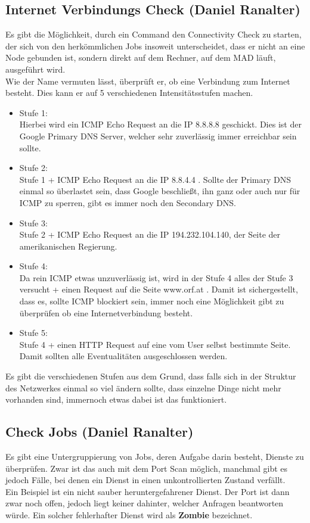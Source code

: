 \documentclass[12pt,a4paper]{report}
\begin{document}
\begin{onehalfspace}
\subsection{Internet Verbindungs Check (Daniel Ranalter)}
Es gibt die Möglichkeit, durch ein Command den Connectivity Check zu starten, der sich von den herkömmlichen Jobs insoweit unterscheidet, dass er nicht an eine Node gebunden ist, sondern direkt auf dem Rechner, auf dem MAD läuft, ausgeführt wird.\\
Wie der Name vermuten lässt, überprüft er, ob eine Verbindung zum Internet besteht. Dies kann er auf 5 verschiedenen Intensitätsstufen machen.\\
\begin{itemize}
\item Stufe 1:\\
Hierbei wird ein ICMP Echo Request an die IP 8.8.8.8 geschickt. Dies ist der Google Primary DNS Server, welcher sehr zuverlässig immer erreichbar sein sollte.
\item Stufe 2:\\
Stufe 1 + ICMP Echo Request an die IP 8.8.4.4 . Sollte der Primary DNS einmal so überlastet sein, dass Google beschließt, ihn ganz oder auch nur für ICMP zu sperren, gibt es immer noch den Secondary DNS.
\item Stufe 3:\\
Stufe 2 + ICMP Echo Request an die IP 194.232.104.140, der Seite der amerikanischen Regierung. 
\item Stufe 4:\\
Da rein ICMP etwas unzuverlässig ist, wird in der Stufe 4 alles der Stufe 3 versucht + einen Request auf die Seite www.orf.at . Damit ist sichergestellt, dass es, sollte ICMP blockiert sein, immer noch eine Möglichkeit gibt zu überprüfen ob eine Internetverbindung besteht.
\item Stufe 5:\\
Stufe 4 + einen HTTP Request auf eine vom User selbst bestimmte Seite. Damit sollten alle Eventualitäten ausgeschlossen werden. 
\end{itemize}

Es gibt die verschiedenen Stufen aus dem Grund, dass falls sich in der Struktur des Netzwerkes einmal so viel ändern sollte, dass einzelne Dinge nicht mehr vorhanden sind, immernoch etwas dabei ist das funktioniert.

\subsection{Check Jobs (Daniel Ranalter)}
Es gibt eine Untergruppierung von Jobs, deren Aufgabe darin besteht, Dienste zu überprüfen. Zwar ist das auch mit dem Port Scan möglich, manchmal gibt es jedoch Fälle, bei denen ein Dienst in einen unkontrollierten Zustand verfällt.\\
Ein Beispiel ist ein nicht sauber heruntergefahrener Dienst. Der Port ist dann zwar noch offen, jedoch liegt keiner dahinter, welcher Anfragen beantworten würde. Ein solcher fehlerhafter Dienst wird als \textbf{Zombie} bezeichnet.\\


\end{onehalfspace}
\end{document}
